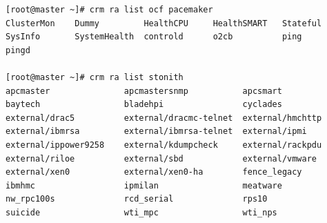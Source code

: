 \begin{verbatim}
[root@master ~]# crm ra list ocf pacemaker
ClusterMon    Dummy         HealthCPU     HealthSMART   Stateful      SysInfo       SystemHealth  controld      o2cb          ping
pingd      

[root@master ~]# crm ra list stonith
apcmaster               apcmastersnmp           apcsmart                baytech                 bladehpi                cyclades
external/drac5          external/dracmc-telnet  external/hmchttp        external/ibmrsa         external/ibmrsa-telnet  external/ipmi
external/ippower9258    external/kdumpcheck     external/rackpdu        external/riloe          external/sbd            external/vmware
external/xen0           external/xen0-ha        fence_legacy            ibmhmc                  ipmilan                 meatware
nw_rpc100s              rcd_serial              rps10                   suicide                 wti_mpc                 wti_nps
\end{verbatim}

